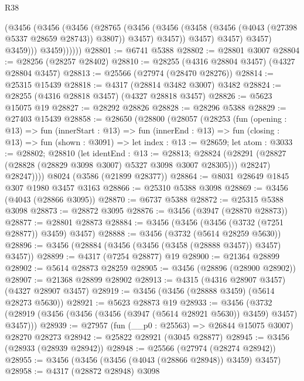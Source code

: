 \begin{lexlean}{R38}
\begin{coremodule}
                      (@3456
                        (@3456
                          (@3456
                            (@28765
                              (@3456
                                (@3456
                                  (@3458 (@3456 (@4043 (@27398 @5337 @28659 @28743)) @3807))
                                  @3457)
                                @3457))
                            @3457)
                          @3457)
                        @3457)
                      @3459)))
                @3459))))))
@28801 := @6741 @5388
@28802 := @28801 @3007
@28804 := @28256 (@28257 @28402)
@28810 := @28255 (@4316 @28804 @3457) (@4327 @28804 @3457)
@28813 := @25566 (@27974 (@28470 @28276))
@28814 := @25315 @15439
@28818 := @4317 (@28814 @3482 @3007) @3482
@28824 := @28255 (@4316 @28818 @3457) (@4327 @28818 @3457)
@28826 := @5623 @15075 @19
@28827 := @28292 @28826
@28828 := @28296 @5388
@28829 := @27403 @15439
@28858 := @28650
    (@28800
      (@28057
        (@28253
          (fun (opening : @13) =>
          fun (innerStart : @13) =>
          fun (innerEnd : @13) =>
          fun (closing : @13) =>
          fun (shown : @3091) =>
          let index : @13 := @28659;
          let atom : @3033 := @28802;
          @28810
            (let identEnd : @13 := @28813;
            @28824 (@28291 (@28827 (@28828 (@28829 @3098 @3007) @5327 @3098 @3007 @28305))) @28247)
            @28247))))
    @8024
    (@3586 (@21899 @28377))
@28864 := @8031 @28649 @1845 @307 @1980 @3457 @3163
@28866 := @25310 @5388 @3098
@28869 := @3456 (@4043 (@28866 @3095))
@28870 := @6737 @5388
@28872 := @25315 @5388 @3098
@28873 := @28872 @3095
@28876 := @3456 (@3947 (@28870 @28873))
@28877 := @28801 @28873
@28884 := @3456 (@3456 (@3456 (@3732 (@7251 @28877)) @3459) @3457)
@28888 := @3456 (@3732 (@5614 @28259 @5630))
@28896 := @3456 (@28884 (@3456 (@3456 (@3458 (@28888 @3457)) @3457) @3457))
@28899 := @4317 (@7254 @28877) @19
@28900 := @21364 @28899
@28902 := @5614 @28873 @28259
@28905 := @3456 (@28896 (@28900 @28902))
@28907 := @21368 @28899 @28902
@28913 := @4315 (@4316 @28907 @3457) (@4327 @28907 @3457)
@28919 := @3456 (@3456 (@28888 @3459) (@5614 @28273 @5630))
@28921 := @5623 @28873 @19
@28933 := @3456
    (@3732 (@28919 (@3456 (@3456 (@3456 (@3947 (@5614 @28921 @5630)) @3459) @3457) @3457)))
@28939 := @27957 (fun (__p0 : @25563) => @26844 @15075 @3007) @28270 @28273
@28942 := @25822 @28921 (@3045 @28877)
@28945 := @3456 (@28933 (@28939 @28942))
@28948 := @25566 (@27974 (@28274 @28942))
@28955 := @3456 (@3456 (@3456 (@4043 (@28866 @28948)) @3459) @3457)
@28958 := @4317 (@28872 @28948) @3098

\end{coremodule}
\end{lexlean}
